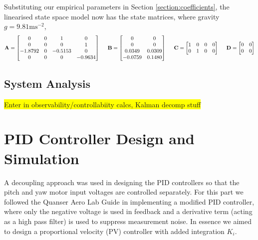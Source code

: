 \documentclass[11pt]{article}
\begin{document}
Substituting our empirical parameters in Section \ref{section:coefficients}, the linearised state space model now has the state matrices, where gravity $g = 9.81\text{ms}^{-2}$,
\begin{align*}
\mathbf{A} = \begin{bmatrix}
    0 & 0 & 1 & 0\\
    0 & 0 & 0 & 1\\
    -1.8792 & 0 & -0.5153 & 0\\
    0 & 0 & 0 & -0.9634
    \end{bmatrix} \hspace{.5cm}
\mathbf{B} = \begin{bmatrix}
    0 & 0\\
    0 & 0\\
    0.0349 & 0.0309\\
    -0.0759 & 0.1480
    \end{bmatrix} \hspace{.5cm}
\mathbf{C} = \begin{bmatrix}
    1 & 0 & 0 & 0\\
    0 & 1 & 0 & 0
    \end{bmatrix} \hspace{.5cm}
\mathbf{D} = \begin{bmatrix}
    0 & 0\\
    0 & 0
\end{bmatrix}
\end{align*}

\subsection{System Analysis}
\colorbox{yellow}{Enter in observability/controllabiity calcs, Kalman decomp stuff}

\newpage %
\section{PID Controller Design and Simulation}
A decoupling approach was used in designing the PID controllers so that the pitch and yaw motor input voltages are controlled separately. For this part we followed the Quanser Aero Lab Guide in implementing a modified PID controller, where only the negative voltage is used in feedback and a derivative term (acting as a high pass filter) is used to suppress measurement noise. In essence we aimed to design a proportional velocity (PV) controller with added integration $K_i$.\\ 
\end{document}
